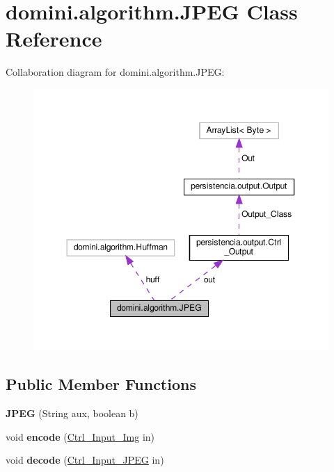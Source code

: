 \hypertarget{classdomini_1_1algorithm_1_1JPEG}{}\section{domini.\+algorithm.\+J\+P\+EG Class Reference}
\label{classdomini_1_1algorithm_1_1JPEG}


Collaboration diagram for domini.\+algorithm.\+J\+P\+EG\+:\nopagebreak
\begin{figure}[H]
\begin{center}
\leavevmode
\includegraphics[width=350pt]{classdomini_1_1algorithm_1_1JPEG__coll__graph}
\end{center}
\end{figure}
\subsection*{Public Member Functions}
\begin{DoxyCompactItemize}
\item 
\mbox{\label{classdomini_1_1algorithm_1_1JPEG_a9dce5a80ccc8b626758cb4ae0b93e056}} 
{\bfseries J\+P\+EG} (String aux, boolean b)
\item 
\mbox{\label{classdomini_1_1algorithm_1_1JPEG_a4ba23333674aafc965dc90e077e4c2ab}} 
void {\bfseries encode} (\hyperlink{classpersistencia_1_1input_1_1Ctrl__Input__Img}{Ctrl\+\_\+\+Input\+\_\+\+Img} in)
\item 
\mbox{\label{classdomini_1_1algorithm_1_1JPEG_ada412451f1905760bb3d528aaa24e4cb}} 
void {\bfseries decode} (\hyperlink{classpersistencia_1_1input_1_1Ctrl__Input__JPEG}{Ctrl\+\_\+\+Input\+\_\+\+J\+P\+EG} in)
\end{DoxyCompactItemize}
